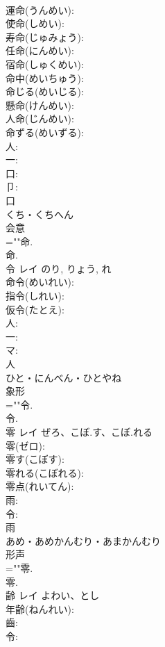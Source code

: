 \documentclass[8pt]{extreport}
\begin{document}
\begin{CJK}{UTF8}{min}
\\	運命(うんめい): 
\\	使命(しめい): 
\\	寿命(じゅみょう): 
\\	任命(にんめい): 
\\	宿命(しゅくめい): 
\\	命中(めいちゅう): 
\\	命じる(めいじる): 
\\	懸命(けんめい): 
\\	人命(じんめい): 
\\	命ずる(めいずる): 
\\	人: 
\\	一: 
\\	口: 
\\	卩: 
\\	口	
\\	くち・くちへん	
\\	会意 
\\	=""命.
\\	命.
\\	令	レイ		のり, りょう, れ	
\\	命令(めいれい): 
\\	指令(しれい): 
\\	仮令(たとえ): 
\\	人: 
\\	一: 
\\	マ: 
\\	人	
\\	ひと・にんべん・ひとやね	
\\	象形 
\\	=""令.
\\	令.
\\	零	レイ	ぜろ、こぼ.す、こぼ.れる		
\\	零(ゼロ): 
\\	零す(こぼす): 
\\	零れる(こぼれる): 
\\	零点(れいてん): 
\\	雨: 
\\	令: 
\\	雨	
\\	あめ・あめかんむり・あまかんむり	
\\	形声 
\\	=""零.
\\	零.
\\	齢	レイ	よわい、とし		
\\	年齢(ねんれい): 
\\	齒: 
\\	令: 

\end{CJK}
\end{document}
